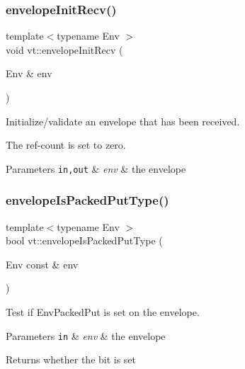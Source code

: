 \subsubsection{\texorpdfstring{envelope\+Init\+Recv()}{envelopeInitRecv()}}
{\footnotesize\ttfamily template$<$typename Env $>$ \\
void vt\+::envelope\+Init\+Recv (\begin{DoxyParamCaption}\item[{Env \&}]{env }\end{DoxyParamCaption})\hspace{0.3cm}{\ttfamily [inline]}}



Initialize/validate an envelope that has been received. 

The ref-\/count is set to zero.


\begin{DoxyParams}[1]{Parameters}
\mbox{\tt in,out}  & {\em env} & the envelope \\
\hline
\end{DoxyParams}
\mbox{\label{namespacevt_aba8a23bc60c8177816d94e913aed6107}} 
\subsubsection{\texorpdfstring{envelope\+Is\+Packed\+Put\+Type()}{envelopeIsPackedPutType()}}
{\footnotesize\ttfamily template$<$typename Env $>$ \\
bool vt\+::envelope\+Is\+Packed\+Put\+Type (\begin{DoxyParamCaption}\item[{Env const \&}]{env }\end{DoxyParamCaption})\hspace{0.3cm}{\ttfamily [inline]}}



Test if {\ttfamily Env\+Packed\+Put} is set on the envelope. 


\begin{DoxyParams}[1]{Parameters}
\mbox{\tt in}  & {\em env} & the envelope\\
\hline
\end{DoxyParams}
\begin{DoxyReturn}{Returns}
whether the bit is set 
\end{DoxyReturn}
\mbox{\label{namespacevt_a68c41bd1b8addd0f8feea15a61d5c372}} 
